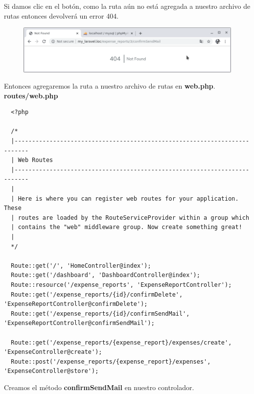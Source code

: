 \documentclass{article}
\begin{document}
Si damos clic en el botón, como la ruta aún no está agregada a nuestro archivo
de rutas entonces devolverá un error 404.

\begin{figure}[h!]
  \centering
  \includegraphics[scale=0.5]{./Pictures/120_404.png}
\end{figure}

Entonces agregaremos la ruta a nuestro archivo de rutas en \textbf{web.php}.\\

\textbf{routes/web.php}
\begin{verbatim}
  <?php

  /*
  |--------------------------------------------------------------------------
  | Web Routes
  |--------------------------------------------------------------------------
  |
  | Here is where you can register web routes for your application. These
  | routes are loaded by the RouteServiceProvider within a group which
  | contains the "web" middleware group. Now create something great!
  |
  */

  Route::get('/', 'HomeController@index');
  Route::get('/dashboard', 'DashboardController@index');
  Route::resource('/expense_reports', 'ExpenseReportController');
  Route::get('/expense_reports/{id}/confirmDelete', 'ExpenseReportController@confirmDelete');
  Route::get('/expense_reports/{id}/confirmSendMail', 'ExpenseReportController@confirmSendMail');

  Route::get('/expense_reports/{expense_report}/expenses/create', 'ExpenseController@create');
  Route::post('/expense_reports/{expense_report}/expenses', 'ExpenseController@store');
\end{verbatim}

Creamos el método \textbf{confirmSendMail} en nuestro controlador.\\
\end{document}

